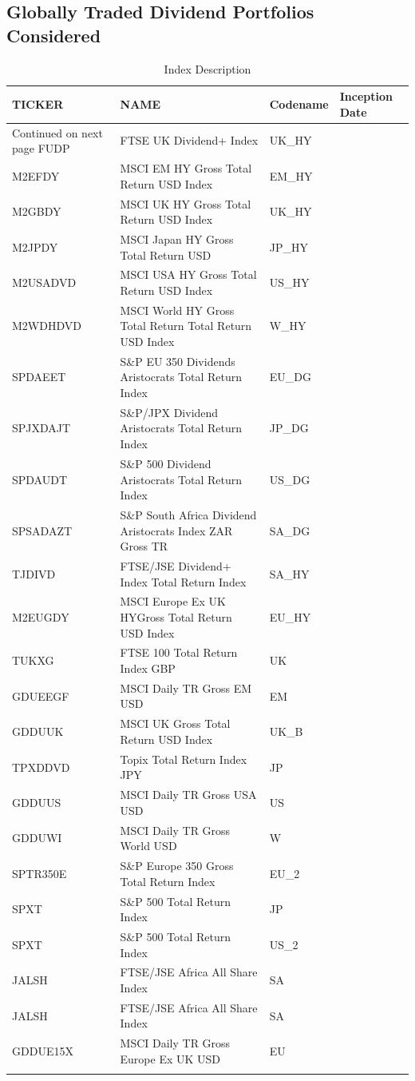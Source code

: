 \documentclass[12pt,preprint, authoryear]{elsarticle}
\numberwithin{equation}{section}
\numberwithin{figure}{section}
\numberwithin{table}{section}
\begin{document}
\hypertarget{globally-traded-dividend-portfolios-considered}{%
\subsection{Globally Traded Dividend Portfolios
Considered}\label{globally-traded-dividend-portfolios-considered}}

\begingroup\fontsize{8pt}{9pt}\selectfont
\begin{longtable}{llll}
  \toprule
TICKER & NAME & Codename & Inception Date \\ 
  \hline 
\endhead 
\hline 
{\footnotesize Continued on next page} 
\endfoot 
\endlastfoot 
 \midrule
FUDP & FTSE UK Dividend+ Index & UK\_HY &  \\ 
  M2EFDY & MSCI EM HY Gross Total Return USD Index & EM\_HY &  \\ 
  M2GBDY & MSCI UK HY Gross Total Return USD Index & UK\_HY &  \\ 
  M2JPDY & MSCI Japan HY Gross Total Return USD & JP\_HY &  \\ 
  M2USADVD & MSCI USA HY Gross Total Return USD Index & US\_HY &  \\ 
  M2WDHDVD & MSCI World HY Gross Total Return Total Return USD Index & W\_HY &  \\ 
  SPDAEET & S\&P EU 350 Dividends Aristocrats Total Return Index & EU\_DG &  \\ 
  SPJXDAJT & S\&P/JPX Dividend Aristocrats Total Return Index & JP\_DG &  \\ 
  SPDAUDT & S\&P 500 Dividend Aristocrats Total Return Index & US\_DG &  \\ 
  SPSADAZT & S\&P South Africa Dividend Aristocrats Index ZAR Gross TR & SA\_DG &  \\ 
  TJDIVD & FTSE/JSE Dividend+ Index Total Return Index & SA\_HY &  \\ 
  M2EUGDY & MSCI Europe Ex UK HYGross Total Return USD Index & EU\_HY &  \\ 
  TUKXG & FTSE 100 Total Return Index GBP & UK &  \\ 
  GDUEEGF & MSCI Daily TR Gross EM USD & EM &  \\ 
  GDDUUK & MSCI UK Gross Total Return USD Index & UK\_B &  \\ 
  TPXDDVD & Topix Total Return Index JPY & JP &  \\ 
  GDDUUS & MSCI Daily TR Gross USA USD & US &  \\ 
  GDDUWI & MSCI Daily TR Gross World USD & W &  \\ 
  SPTR350E & S\&P Europe 350 Gross Total Return Index & EU\_2 &  \\ 
  SPXT & S\&P 500 Total Return Index & JP &  \\ 
  SPXT & S\&P 500 Total Return Index & US\_2 &  \\ 
  JALSH & FTSE/JSE Africa All Share Index & SA &  \\ 
  JALSH & FTSE/JSE Africa All Share Index & SA &  \\ 
  GDDUE15X & MSCI Daily TR Gross Europe Ex UK USD & EU &  \\ 
   \bottomrule
\caption{Index Description \label{indexdes}} 
\end{longtable}
\endgroup
\end{document}
